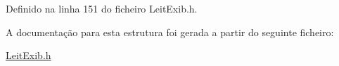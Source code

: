 Definido na linha 151 do ficheiro Leit\-Exib.\-h.



A documentação para esta estrutura foi gerada a partir do seguinte ficheiro\-:\begin{DoxyCompactItemize}
\item 
\hyperlink{_leit_exib_8h}{Leit\-Exib.\-h}\end{DoxyCompactItemize}
